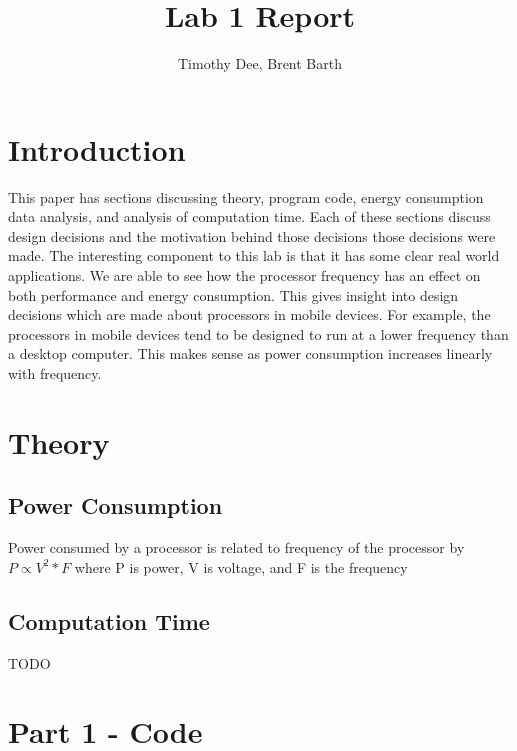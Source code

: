 \documentclass{article} %
\author{Timothy Dee, Brent Barth}
\title{Lab 1 Report}
\begin{document}
\twocolumn
\thispagestyle{empty}   %
\maketitle      %



\section{Introduction}
This paper has sections discussing theory, program code, energy consumption data analysis, and analysis of computation time. Each of these sections discuss design decisions and the motivation behind those decisions those decisions were made.
The interesting component to this lab is that it has some clear real world applications. We are able to see how the processor frequency has an effect on both performance and energy consumption. 
This gives insight into design decisions which are made about processors in mobile devices. For example, the processors in mobile devices tend to be designed to run at a lower frequency than a desktop computer. This makes sense as power consumption increases linearly with frequency. 

\section{Theory}
\subsection{Power Consumption}
Power consumed by a processor is related to frequency of the processor by $P \propto V^2*F$ where P is power, V is voltage, and F is the frequency
\subsection{Computation Time}
TODO

\section{Part 1 - Code}
\end{document}
